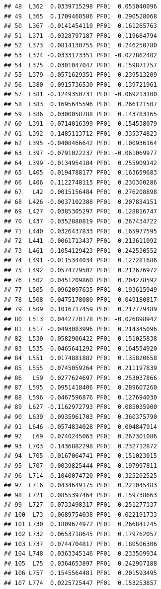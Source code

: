 \documentclass[
]{article}
\begin{document}
\begin{verbatim}
## 48  L362  0.0339715298 PF01  0.055040096
## 49  L365  0.1709460586 PF01  0.290528068
## 50  L367 -0.0141454119 PF01  0.161265763
## 51  L371 -0.0328797187 PF01  0.119684794
## 52  L373  0.0814130755 PF01  0.246250780
## 53  L374 -0.0333173351 PF01 -0.027862402
## 54  L375  0.0301047047 PF01  0.159871757
## 55  L379 -0.0571629351 PF01  0.239513209
## 56  L380 -0.0915736530 PF01  0.139721961
## 57  L381 -0.1249350731 PF01 -0.069213100
## 58  L383  0.1695645596 PF01  0.266121507
## 59  L386  0.0300058788 PF01  0.143783165
## 60  L391  0.0714016399 PF01  0.154538079
## 61  L392  0.1485113712 PF01  0.335374823
## 62  L395 -0.0408466642 PF01  0.100936164
## 63  L397 -0.0791022237 PF01 -0.061069977
## 64  L399 -0.0134954184 PF01  0.255909142
## 65  L405  0.0194788177 PF01  0.163659683
## 66  L406  0.1122748115 PF01  0.230300286
## 67   L42  0.0015156484 PF01  0.276208898
## 68  L426 -0.0037102388 PF01  0.207834151
## 69  L427  0.0385305297 PF01  0.128816747
## 70  L437  0.0352880819 PF01  0.267434722
## 71  L440  0.0326437833 PF01  0.165977595
## 72  L441 -0.0061713437 PF01  0.213611092
## 73  L461  0.1054129423 PF01  0.242530552
## 74  L491 -0.0115344034 PF01  0.127281686
## 75  L492  0.0574779502 PF01  0.212676972
## 76  L502  0.0451209860 PF01  0.204278592
## 77  L505  0.0962097635 PF01  0.193615949
## 78  L508 -0.0475178080 PF01  0.049180817
## 79  L509  0.1016717459 PF01  0.217779489
## 80  L513  0.0442770178 PF01 -0.026898942
## 81  L517 -0.0493083996 PF01  0.214345096
## 82  L530  0.0582906422 PF01  0.151025838
## 83  L535 -0.0465641292 PF01  0.164554920
## 84  L551  0.0174881882 PF01  0.135820658
## 85  L555  0.0745059264 PF01  0.211197839
## 86   L59  0.0277624697 PF01  0.253037866
## 87  L595  0.0951418406 PF01  0.289607260
## 88  L596  0.0467596876 PF01  0.127694030
## 89  L627 -0.1162972793 PF01  0.085035900
## 90  L639  0.0935961703 PF01  0.360375790
## 91  L646 -0.0574834028 PF01  0.004847914
## 92   L69  0.0740245063 PF01  0.267301086
## 93  L703  0.1436882298 PF01  0.232712872
## 94  L705 -0.0167064741 PF01  0.151023015
## 95  L707  0.0039825444 PF01  0.197997811
## 96  L714  0.1040074720 PF01  0.325202525
## 97  L716  0.0434649175 PF01  0.221045483
## 98  L721  0.0855397464 PF01  0.159738663
## 99  L727  0.0733498317 PF01  0.251277337
## 100  L73 -0.0689754038 PF01 -0.022191733
## 101 L730  0.1809674972 PF01  0.266841245
## 102 L732  0.0653718645 PF01  0.179762057
## 103 L737  0.0744704817 PF01  0.180506306
## 104 L748  0.0363345146 PF01  0.233509934
## 105  L75  0.0364653897 PF01  0.242907188
## 106 L757  0.1545564481 PF01  0.201593495
## 107 L774  0.0225725447 PF01  0.153253857

\end{verbatim}
\end{document}

